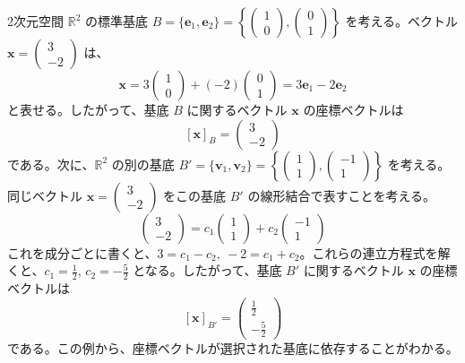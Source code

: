 \begin{ex}[座標ベクトルの例]
2次元空間 $\mathbb{R}^2$ の標準基底 $B = \{\bm{e}_1, \bm{e}_2\} = \left\{ \begin{pmatrix} 1 \\ 0 \end{pmatrix}, \begin{pmatrix} 0 \\ 1 \end{pmatrix} \right\}$ を考える。ベクトル $\bm{x} = \begin{pmatrix} 3 \\ -2 \end{pmatrix}$ は、
\[ \bm{x} = 3 \begin{pmatrix} 1 \\ 0 \end{pmatrix} + (-2) \begin{pmatrix} 0 \\ 1 \end{pmatrix} = 3\bm{e}_1 - 2\bm{e}_2 \]
と表せる。したがって、基底 $B$ に関するベクトル $\bm{x}$ の座標ベクトルは
\[ [\bm{x}]_B = \begin{pmatrix} 3 \\ -2 \end{pmatrix} \]
である。次に、$\mathbb{R}^2$ の別の基底 $B' = \{\bm{v}_1, \bm{v}_2\} = \left\{ \begin{pmatrix} 1 \\ 1 \end{pmatrix}, \begin{pmatrix} -1 \\ 1 \end{pmatrix} \right\}$ を考える。同じベクトル $\bm{x} = \begin{pmatrix} 3 \\ -2 \end{pmatrix}$ をこの基底 $B'$ の線形結合で表すことを考える。
\[ \begin{pmatrix} 3 \\ -2 \end{pmatrix} = c_1 \begin{pmatrix} 1 \\ 1 \end{pmatrix} + c_2 \begin{pmatrix} -1 \\ 1 \end{pmatrix} \]
これを成分ごとに書くと、$3 = c_1 - c_2,\ -2 = c_1 + c_2$。これらの連立方程式を解くと、$c_1 = \frac{1}{2}$, $c_2 = -\frac{5}{2}$ となる。したがって、基底 $B'$ に関するベクトル $\bm{x}$ の座標ベクトルは
\[ [\bm{x}]_{B'} = \begin{pmatrix} \frac{1}{2} \\ -\frac{5}{2} \end{pmatrix} \]
である。この例から、座標ベクトルが選択された基底に依存することがわかる。
\end{ex}

